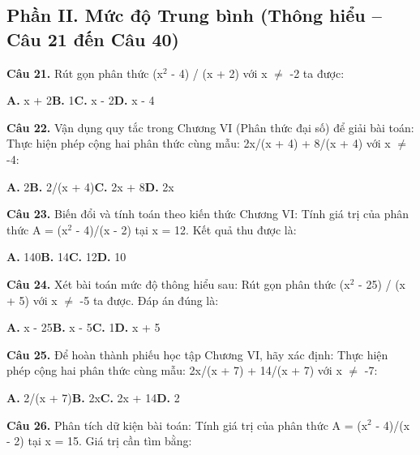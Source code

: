 \documentclass[11pt,a4paper]{article}
\begin{document}
\subsection*{\color{accent} Phần II. Mức độ Trung bình (Thông hiểu -- Câu 21 đến Câu 40)}
\textbf{\color{primary} Câu 21.} Rút gọn phân thức (x$^2$ - 4) / (x + 2) với x $\ne$ -2 ta được:\par
\hspace*{1.5em}\textbf{A.} x + 2\quad\quad \textbf{B.} 1\quad\quad \textbf{C.} x - 2\quad\quad \textbf{D.} x - 4\par\vspace{2pt}
\textbf{\color{primary} Câu 22.} Vận dụng quy tắc trong Chương VI (Phân thức đại số) để giải bài toán: Thực hiện phép cộng hai phân thức cùng mẫu: 2x/(x + 4) + 8/(x + 4) với x $\ne$ -4:\par
\hspace*{1.5em}\textbf{A.} 2\quad\quad \textbf{B.} 2/(x + 4)\quad\quad \textbf{C.} 2x + 8\quad\quad \textbf{D.} 2x\par\vspace{2pt}
\textbf{\color{primary} Câu 23.} Biến đổi và tính toán theo kiến thức Chương VI: Tính giá trị của phân thức A = (x$^2$ - 4)/(x - 2) tại x = 12. Kết quả thu được là:\par
\hspace*{1.5em}\textbf{A.} 140\quad\quad \textbf{B.} 14\quad\quad \textbf{C.} 12\quad\quad \textbf{D.} 10\par\vspace{2pt}
\textbf{\color{primary} Câu 24.} Xét bài toán mức độ thông hiểu sau: Rút gọn phân thức (x$^2$ - 25) / (x + 5) với x $\ne$ -5 ta được. Đáp án đúng là:\par
\hspace*{1.5em}\textbf{A.} x - 25\quad\quad \textbf{B.} x - 5\quad\quad \textbf{C.} 1\quad\quad \textbf{D.} x + 5\par\vspace{2pt}
\textbf{\color{primary} Câu 25.} Để hoàn thành phiếu học tập Chương VI, hãy xác định: Thực hiện phép cộng hai phân thức cùng mẫu: 2x/(x + 7) + 14/(x + 7) với x $\ne$ -7:\par
\hspace*{1.5em}\textbf{A.} 2/(x + 7)\quad\quad \textbf{B.} 2x\quad\quad \textbf{C.} 2x + 14\quad\quad \textbf{D.} 2\par\vspace{2pt}
\textbf{\color{primary} Câu 26.} Phân tích dữ kiện bài toán: Tính giá trị của phân thức A = (x$^2$ - 4)/(x - 2) tại x = 15. Giá trị cần tìm bằng:\par
\end{document}
